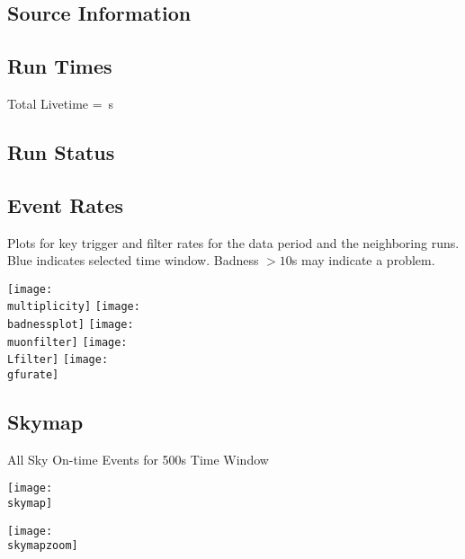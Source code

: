 \documentclass[titlepage]{article}
\begin{document}
\subsection{Source Information}
\sourcetable

\subsection{Run Times}
\runtimetable

Total Livetime = \livetime\,s

\subsection{Run Status}
\runstatustable

\pagebreak
\subsection{Event Rates}
Plots for key trigger and filter rates for the data period
and the neighboring runs.  Blue indicates selected time window.
Badness $>10$s may indicate a problem.

\vspace{1em}
{
 \centering
 \texttt{[image: \\multiplicity]}
 \texttt{[image: \\badnessplot]}
 \texttt{[image: \\muonfilter]}
 \texttt{[image: \\Lfilter]}
 \texttt{[image: \\gfurate]}
}


%
%
%
%
%
%
%

\pagebreak
\subsection{Skymap}

{
  \centering
  {\Large All Sky On-time Events for 500s Time Window}

  \texttt{[image: \\skymap]}

  \texttt{[image: \\skymapzoom]}

}
\pagebreak
\end{document}
